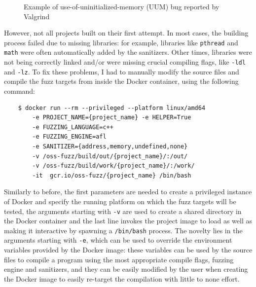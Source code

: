 \begin{figure}[h]
\caption{Example of use-of-uninitialized-memory (UUM) bug reported by Valgrind}
\label{fig:valgrind_example}
\end{figure}


\newpage
However, not all projects built on their first attempt.
In most cases, the building process failed due to missing libraries: for example, libraries like \verb|pthread| and \verb|math| were often automatically added by the sanitizers. Other times, libraries were not being correctly linked and/or were missing crucial compiling flags, like \verb|-ldl| and \verb|-lz|. To fix these problems, I had to manually modify the source files and compile the fuzz targets from inside the Docker container, using the following command:
\begin{verbatim}
    $ docker run --rm --privileged --platform linux/amd64 
        -e PROJECT_NAME={project_name} -e HELPER=True 
        -e FUZZING_LANGUAGE=c++ 
        -e FUZZING_ENGINE=afl 
        -e SANITIZER={address,memory,undefined,none} 
        -v /oss-fuzz/build/out/{project_name}/:/out/   
        -v /oss-fuzz/build/work/{project_name}/:/work/
        -it  gcr.io/oss-fuzz/{project_name} /bin/bash
\end{verbatim}
Similarly to before, the first parameters are needed to create a privileged instance of Docker and specify the running platform on which the fuzz targets will be tested, the arguments starting with \verb|-v| are used to create a shared directory in the Docker container and the last line invokes the project image to load as well as making it interactive by spawning a \verb|/bin/bash| process.
The novelty lies in the arguments starting with \verb|-e|, which can be used to override the environment variables provided by the Docker image: these variables can be used by the source files to compile a program using the most appropriate compile flags, fuzzing engine and sanitizers, and they can be easily modified by the user when creating the Docker image to easily re-target the compilation with little to none effort. 














